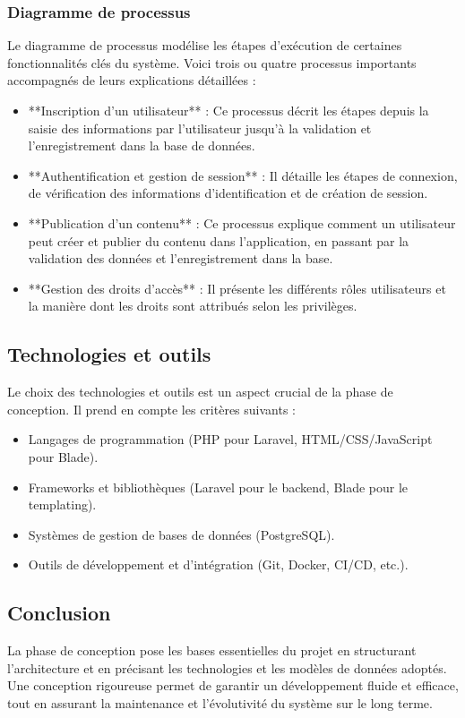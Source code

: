 \subsubsection{Diagramme de processus}
Le diagramme de processus modélise les étapes d'exécution de certaines fonctionnalités clés du système. Voici trois ou quatre processus importants accompagnés de leurs explications détaillées :
\begin{itemize}
    \item **Inscription d'un utilisateur** : Ce processus décrit les étapes depuis la saisie des informations par l'utilisateur jusqu'à la validation et l'enregistrement dans la base de données.
    \item **Authentification et gestion de session** : Il détaille les étapes de connexion, de vérification des informations d'identification et de création de session.
    \item **Publication d'un contenu** : Ce processus explique comment un utilisateur peut créer et publier du contenu dans l'application, en passant par la validation des données et l'enregistrement dans la base.
    \item **Gestion des droits d'accès** : Il présente les différents rôles utilisateurs et la manière dont les droits sont attribués selon les privilèges.
\end{itemize}

\subsection{Technologies et outils}
Le choix des technologies et outils est un aspect crucial de la phase de conception. Il prend en compte les critères suivants :
\begin{itemize}
    \item Langages de programmation (PHP pour Laravel, HTML/CSS/JavaScript pour Blade).
    \item Frameworks et bibliothèques (Laravel pour le backend, Blade pour le templating).
    \item Systèmes de gestion de bases de données (PostgreSQL).
    \item Outils de développement et d’intégration (Git, Docker, CI/CD, etc.).
\end{itemize}

\subsection{Conclusion}
La phase de conception pose les bases essentielles du projet en structurant l'architecture et en précisant les technologies et les modèles de données adoptés. Une conception rigoureuse permet de garantir un développement fluide et efficace, tout en assurant la maintenance et l'évolutivité du système sur le long terme.

